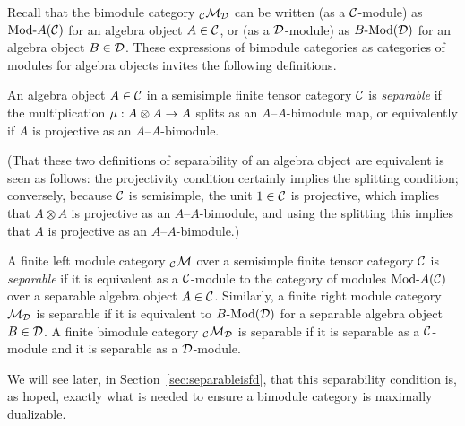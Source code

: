 \documentclass{amsart}
\begin{document}
Recall that the bimodule category ${}_\mathcal C \mathcal M_\mathcal D$ can be written (as a $\mathcal C$-module) as $\Mod{}{A}(\cC)$ for an algebra object $A \in \mathcal C$, or (as a $\mathcal D$-module) as $\Mod{B}{}(\cD)$ for an algebra object $B \in \mathcal D$.  These expressions of bimodule categories as categories of modules for algebra objects invites the following definitions.
\begin{definition}
An algebra object $A \in \mathcal C$ in a semisimple finite tensor category $\mathcal C$ is \emph{separable} if the multiplication $\mu: A \otimes A \rightarrow A$ splits as an $A$--$A$-bimodule map, or equivalently if $A$ is projective as an $A$--$A$-bimodule.
\end{definition}
\noindent (That these two definitions of separability of an algebra object are equivalent is seen as follows: the projectivity condition certainly implies the splitting condition; conversely, because $\mathcal C$ is semisimple, the unit $1 \in \mathcal C$ is projective, which implies that $A \otimes A$ is projective as an $A$--$A$-bimodule, and using the splitting this implies that $A$ is projective as an $A$--$A$-bimodule.)
\begin{definition}
A finite left module category ${}_\mathcal C \mathcal M$ over a semisimple finite tensor category $\mathcal C$ is \emph{separable} if it is equivalent as a $\mathcal C$-module to the category of modules $\Mod{}{A}(\cC)$ over a separable algebra object $A \in \mathcal C$.  Similarly, a finite right module category $\mathcal M_\mathcal D$ is separable if it is equivalent to $\Mod{B}{}(\cD)$ for a separable algebra object $B \in \mathcal D$.  A finite bimodule category ${}_\mathcal C \mathcal M_\mathcal D$ is separable if it is separable as a $\mathcal C$-module and it is separable as a $\mathcal D$-module.
\end{definition}
\noindent We will see later, in Section~\ref{sec:separableisfd}, that this separability condition is, as hoped, exactly what is needed to ensure a bimodule category is maximally dualizable.  
\end{document}
